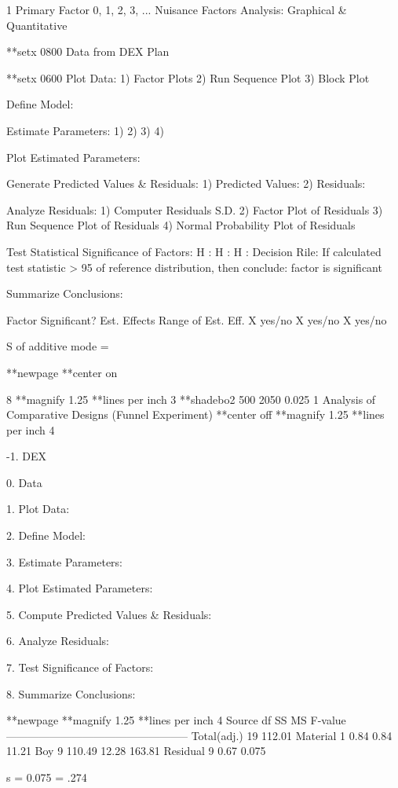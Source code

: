 1 Primary Factor
0, 1, 2, 3, ... Nuisance Factors
Analysis: Graphical & Quantitative
 
**setx 0800
Data from DEX Plan
 
**setx 0600
Plot Data:
      1) Factor Plots
      2) Run Sequence Plot
      3) Block Plot
 
Define Model:
 
Estimate Parameters:
      1)
      2)
      3)
      4)
 
Plot Estimated Parameters:
 
Generate Predicted Values & Residuals:
      1) Predicted Values:
      2) Residuals:
 
Analyze Residuals:
      1) Computer Residuals S.D.
      2) Factor Plot of Residuals
      3) Run Sequence Plot of Residuals
      4) Normal Probability Plot of Residuals
 
Test Statistical Significance of Factors:
      H  :
      H  :
      H  :
      Decision Rile: If calculated test statistic > 95%
                              of reference distribution, then conclude:
                                    factor is significant
 
Summarize Conclusions:
 
      Factor    Significant?    Est. Effects    Range of Est. Eff.
        X            yes/no
        X            yes/no
        X            yes/no
 
        S    of additive mode =
 
**newpage
**center on
 
 
 
 
 
8
**magnify 1.25
**lines per inch 3
**shadebo2 500 2050 0.025 1
Analysis of Comparative Designs (Funnel Experiment)
**center off
**magnify 1.25
**lines per inch 4
 
-1. DEX
 
0. Data
 
1. Plot Data:
 
2. Define Model:
 
3. Estimate Parameters:
 
4. Plot Estimated Parameters:
 
5. Compute Predicted Values & Residuals:
 
6. Analyze Residuals:
 
7. Test Significance of Factors:
 
8. Summarize Conclusions:
 
 
**newpage
**magnify 1.25
**lines per inch 4
Source        df          SS        MS     F-value
--------------------------------------------------
Total(adj.)   19        112.01
Material       1          0.84     0.84      11.21
Boy            9        110.49    12.28     163.81
Residual       9          0.67     0.075
 
 
s    =   0.075   = .274
